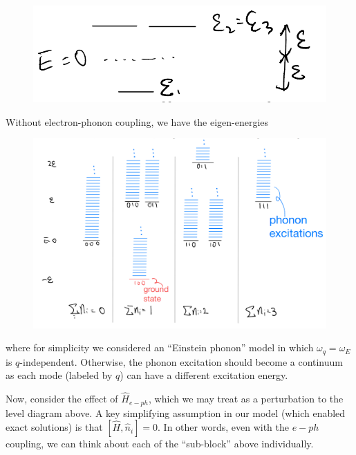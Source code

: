 \begin{figure}[ht]
    \centering
    \includegraphics[width=\textwidth]{jupyterbook/data/fig/lec06-fig00.png}
\end{figure}

Without electron-phonon coupling, we have the eigen-energies

\begin{figure}[ht]
    \centering
    \includegraphics[width=\textwidth]{jupyterbook/data/fig/lec06-fig01.png}
\end{figure}

\noindent where for simplicity we considered an ``Einstein phonon'' model in which $\omega_q=\omega_E$ is $q$-independent. Otherwise, the phonon excitation should become a continuum as each mode (labeled by $q$) can have a different excitation energy.

Now, consider the effect of $\hat{H}_{e-ph}$, which we may treat as a perturbation to the level diagram above. A key simplifying assumption in our model (which enabled exact solutions) is that $[\hat{H},\hat{n}_i]=0$. In other words, even with the $e-ph$ coupling, we can think about each of the ``sub-block'' above individually.

